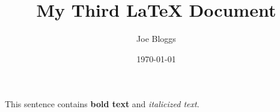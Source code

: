 \documentclass{article}
\begin{document}
\title{My Third LaTeX Document}
\author{Joe Bloggs}
\date{\today}

\maketitle

This sentence contains \textbf{bold text} and \textit{italicized text}.
\end{document}
